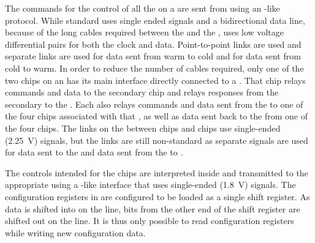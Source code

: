 The commands for the control of all the  on a  are sent 
from  using an -like~\cite{i2c} protocol. While standard 
 uses single ended  signals and a bidirectional data 
line, because of the long cables required between the  and the 
,  uses low voltage differential pairs for both 
the  clock and data. Point-to-point links are used and separate 
links are used for data sent from warm to cold and for data sent from cold to 
warm. In order to reduce the number of cables required, only one of the two 
 chips on an  has its main  interface 
directly connected to a . That  chip relays  
commands and data to the secondary  chip and relays  
responses from the secondary  to the . Each 
 also relays  commands and data sent from the 
 to one of the four  chips associated with that 
, as well as data sent back to the  from one of the 
four  chips. The links on the  between  
chips and  chips use single-ended (\SI{2.25}{V})  
signals, but the  links are still non-standard as separate signals 
are used for data sent to the  and data sent from the 
 to .

The controls intended for the   chips are interpreted 
inside  and transmitted to the appropriate  using 
a -like interface that uses single-ended (\SI{1.8}{V})  
signals. The configuration registers in  are configured to be 
loaded as a single shift register. As data is shifted into  on 
the  line, bits from the other end of the shift register are shifted 
out on the  line. It is thus only possible to read  
configuration registers while writing new configuration data.

